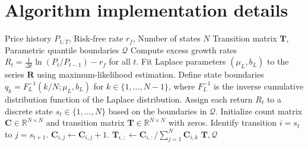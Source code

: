 \documentclass[11pt, letterpaper]{article}
\begin{document}
\newpage



\newpage
\appendix
\section{Algorithm implementation details}
\label{app:algo}

\begin{algorithm}[htpb]
\caption{Empirical hidden Markov model construction via Laplace partitioning}
\label{alg:build}
\begin{algorithmic}[1]
\REQUIRE Price history $P_{1:T}$, Risk-free rate $r_f$, Number of states $N$
\ENSURE Transition matrix $\mathbf{T}$, Parametric quantile boundaries $\mathcal{Q}$
\STATE Compute excess growth rates $R_t = \frac{1}{\Delta t} \ln(P_t / P_{t-1}) - r_f$ for all $t$.
\STATE Fit Laplace parameters $(\mu_L, b_L)$ to the series $\mathbf{R}$ using maximum-likelihood estimation.
\STATE Define state boundaries $q_k = F_L^{-1}(k/N; \mu_L, b_L)$ for $k \in \{1, \dots, N-1\}$, where $F_L^{-1}$ is the inverse cumulative distribution function of the Laplace distribution.
\STATE Assign each return $R_t$ to a discrete state $s_t \in \{1, \dots, N\}$ based on the boundaries in $\mathcal{Q}$.
\STATE Initialize count matrix $\mathbf{C} \in \mathbb{R}^{N \times N}$ and transition matrix $\mathbf{T} \in \mathbb{R}^{N \times N}$ with zeros.
    \STATE Identify transition $i = s_t$ to $j = s_{t+1}$.
\STATE $\mathbf{C}_{i,j} \leftarrow \mathbf{C}_{i,j} + 1$.
\ENDFOR
{}
    \STATE $\mathbf{T}_{i,:} \leftarrow \mathbf{C}_{i,:} / \sum_{j=1}^{N} \mathbf{C}_{i,k}$ 
\ENDFOR
\RETURN $\mathbf{T}, \mathcal{Q}$
\end{algorithmic}
\end{algorithm}
\end{document}
